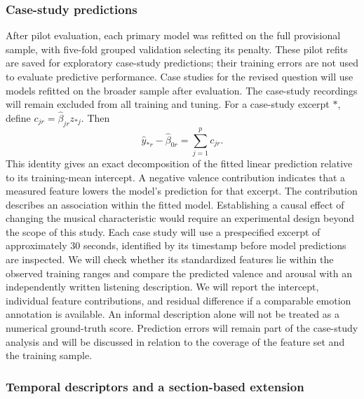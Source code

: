 \subsubsection{Case-study predictions}
After pilot evaluation, each primary model was refitted on the full provisional sample, with five-fold grouped validation selecting its penalty. These pilot refits are saved for exploratory case-study predictions; their training errors are not used to evaluate predictive performance. Case studies for the revised question will use models refitted on the broader sample after evaluation. The case-study recordings will remain excluded from all training and tuning. For a case-study excerpt $\ast$, define $c_{jr}=\widehat\beta_{jr}z_{\ast j}$. Then
\begin{equation}
 \widehat y_{\ast r}-\widehat\beta_{0r}
 =\sum_{j=1}^{p}c_{jr}.
 \label{eq:contributions}
\end{equation}
This identity gives an exact decomposition of the fitted linear prediction relative to its training-mean intercept. A negative valence contribution indicates that a measured feature lowers the model's prediction for that excerpt. The contribution describes an association within the fitted model. Establishing a causal effect of changing the musical characteristic would require an experimental design beyond the scope of this study. Each case study will use a prespecified excerpt of approximately 30 seconds, identified by its timestamp before model predictions are inspected. We will check whether its standardized features lie within the observed training ranges and compare the predicted valence and arousal with an independently written listening description. We will report the intercept, individual feature contributions, and residual difference if a comparable emotion annotation is available. An informal description alone will not be treated as a numerical ground-truth score. Prediction errors will remain part of the case-study analysis and will be discussed in relation to the coverage of the feature set and the training sample.

\subsubsection{Temporal descriptors and a section-based extension}

